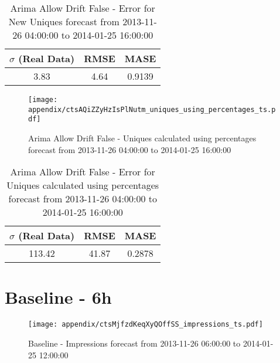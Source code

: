 \begin{table}[H]
\centering
\footnotesize
\begin{tabular}{ccc}
$\sigma$ (Real Data) & RMSE & MASE   \\ \hline
3.83 & 4.64 & 0.9139 \\
\end{tabular}

\vspace{0.5cm}

\caption{
Arima Allow Drift False - Error for New Uniques forecast from 2013-11-26 04:00:00 to 2014-01-25 16:00:00}
\end{table}

\begin{figure}[H] \begin{center} \leavevmode
\texttt{[image: appendix/ctsAQiZZyHzIsPlNutm\_uniques\_using\_percentages\_ts.pdf]} \caption{
Arima Allow Drift False - Uniques calculated using percentages forecast from 2013-11-26 04:00:00 to 2014-01-25 16:00:00} \label{fig:appendix/ctsAQiZZyHzIsPlNutm_uniques_using_percentages_ts.pdf} \end{center}
\end{figure}

\begin{table}[H]
\centering
\footnotesize
\begin{tabular}{ccc}
$\sigma$ (Real Data) & RMSE & MASE   \\ \hline
113.42 & 41.87 & 0.2878 \\
\end{tabular}

\vspace{0.5cm}

\caption{
Arima Allow Drift False - Error for Uniques calculated using percentages forecast from 2013-11-26 04:00:00 to 2014-01-25 16:00:00}
\end{table}

\section{Baseline - 6h}
\begin{figure}[H] \begin{center} \leavevmode
\texttt{[image: appendix/ctsMjfzdKeqXyQOffSS\_impressions\_ts.pdf]} \caption{
Baseline - Impressions forecast from 2013-11-26 06:00:00 to 2014-01-25 12:00:00} \label{fig:appendix/ctsMjfzdKeqXyQOffSS_impressions_ts.pdf} \end{center}
\end{figure}

